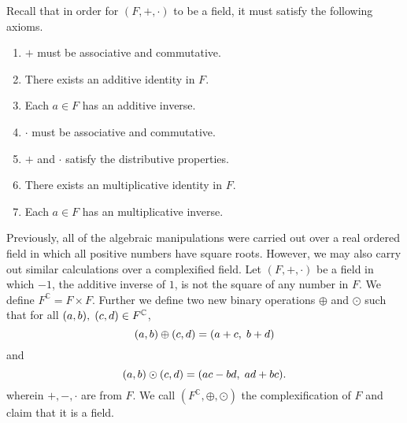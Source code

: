 \documentclass[12pt]{article}
\newcommand{\C}{\mathbb{C}}
\newcommand{\ttc}{, \hspace{1mm}}
\theoremstyle{plain}
\theoremstyle{definition}
\begin{document}
Recall that in order for $(F,+,\cdot)$ to be a field, it must satisfy the following axioms.
\begin{enumerate}
	\item $+$ must be associative and commutative.
	\item There exists an additive identity in $F$.
	\item Each $a\in F$ has an additive inverse.
	\item $\cdot$ must be associative and commutative.
	\item $+$ and $\cdot$ satisfy the distributive properties.
	\item There exists an multiplicative identity in $F$.
	\item Each $a\in F$ has an multiplicative inverse.
\end{enumerate}
Previously, all of the algebraic manipulations were carried out over a real ordered field in which all positive numbers have square roots. However, we may also carry out similar calculations over a complexified field. Let $(F,+,\cdot)$ be a field in which $-1$, the additive inverse of $1$, is not the square of any number in $F$. We define $F^\C = F\times F$. Further we define two new binary operations $\oplus$ and $\odot$ such that for all $(a,b)\ttc (c,d)\in F^\C$,
	\[
		(a,b)\oplus(c,d) = (a + c\ttc b + d)
	\]
and
	\[
		(a,b)\odot(c,d) = (ac - bd\ttc ad + bc).
	\]
wherein $+,-,\cdot$ are from $F$. We call $(F^\C,\oplus,\odot)$ the complexification of $F$ and claim that it is a field. 
\end{document}
